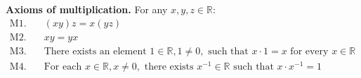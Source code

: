 \textbf{Axioms of multiplication.} For any $x, y, z \in \mathbb{R}$:
\begin{align}
\text{M1.}&\quad (xy)z = x(yz) \\
\text{M2.}&\quad xy = yx \\
\text{M3.}&\quad \text{There exists an element } 1 \in \mathbb{R}, 1 \neq 0, \text{ such that } x \cdot 1 = x \text{ for every } x \in \mathbb{R} \\
\text{M4.}&\quad \text{For each } x \in \mathbb{R}, x \neq 0, \text{ there exists } x^{-1} \in \mathbb{R} \text{ such that } x \cdot x^{-1} = 1
\end{align}

